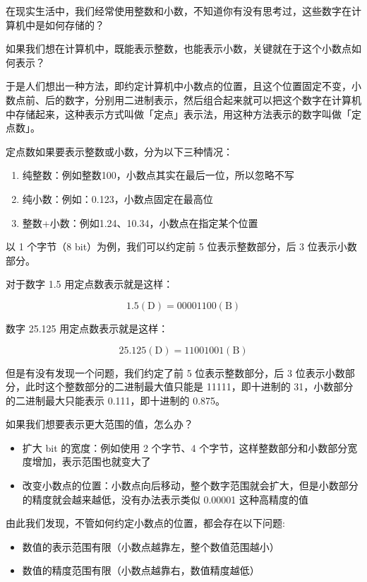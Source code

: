 在现实生活中，我们经常使用整数和小数，不知道你有没有思考过，这些数字在计算机中是如何存储的？

如果我们想在计算机中，既能表示整数，也能表示小数，关键就在于这个小数点如何表示？

于是人们想出一种方法，即约定计算机中小数点的位置，且这个位置固定不变，小数点前、后的数字，分别用二进制表示，然后组合起来就可以把这个数字在计算机中存储起来，这种表示方式叫做「定点」表示法，用这种方法表示的数字叫做「定点数」。

定点数如果要表示整数或小数，分为以下三种情况：

\begin{enumerate}
  \item 纯整数：例如整数100，小数点其实在最后一位，所以忽略不写
  \item 纯小数：例如：0.123，小数点固定在最高位
  \item 整数+小数：例如1.24、10.34，小数点在指定某个位置
\end{enumerate}

以 1 个字节（8 bit）为例，我们可以约定前 5 位表示整数部分，后 3 位表示小数部分。

对于数字 1.5 用定点数表示就是这样：

$$1.5(\mathrm{D}) = 00001 100(\mathrm{B})$$

数字 25.125 用定点数表示就是这样：

$$25.125(\mathrm{D}) = 11001 001(\mathrm{B})$$

但是有没有发现一个问题，我们约定了前 5 位表示整数部分，后 3 位表示小数部分，此时这个整数部分的二进制最大值只能是 11111，即十进制的 31，小数部分的二进制最大只能表示 0.111，即十进制的 0.875。

如果我们想要表示更大范围的值，怎么办？

\begin{itemize}
  \item 扩大 bit 的宽度：例如使用 2 个字节、4 个字节，这样整数部分和小数部分宽度增加，表示范围也就变大了
  \item 改变小数点的位置：小数点向后移动，整个数字范围就会扩大，但是小数部分的精度就会越来越低，没有办法表示类似 0.00001 这种高精度的值
\end{itemize}

由此我们发现，不管如何约定小数点的位置，都会存在以下问题:

\begin{itemize}
  \item 数值的表示范围有限（小数点越靠左，整个数值范围越小）
  \item 数值的精度范围有限（小数点越靠右，数值精度越低）
\end{itemize}

